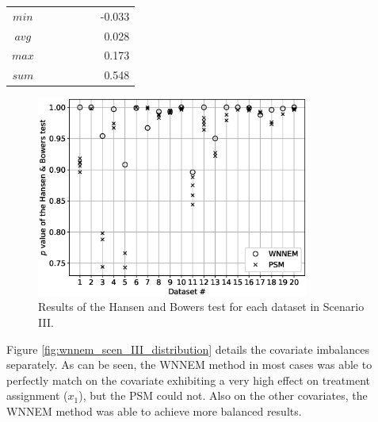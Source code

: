 \begin{table}[h]
\begin{tabular}{ccccccr}
				\midrule
				$min$   &         &           &           &           &       & -0.033     \\
				$avg$   &         &           &           &           &       & 0.028      \\
				$max$   &         &           &           &           &       & 0.173      \\
				$sum$   &         &           &           &           &       & 0.548      \\
				\bottomrule
			\end{tabular}
		\end{table}
								
								
		\begin{figure}[h]
			\centering
                \captionsetup{justification=centering}
			\includegraphics[width=0.8\textwidth]{assets/figures/control_group_selection/wnnem/scenIII/hbp.eps}
			\caption{Results of the Hansen and Bowers test for each dataset in Scenario III.}
			\label{fig:wnnem_scen_III_hbp}    
		\end{figure}
								
								
		Figure \ref{fig:wnnem_scen_III_distribution} details the covariate imbalances separately. As can be seen, the WNNEM method in most cases was able to perfectly match on the covariate exhibiting a very high effect on treatment assignment ($x_1$), but the PSM could not. Also on the other covariates, the WNNEM method was able to achieve more balanced results.
								

